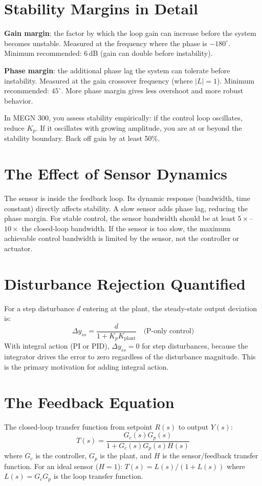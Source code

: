 \documentclass[11pt,letterpaper,twoside,openany]{book}
\begin{document}
\section{Stability Margins in Detail}
\textbf{Gain margin}: the factor by which the loop gain can increase before the system becomes unstable. Measured at the frequency where the phase is $-180^\circ$. Minimum recommended: 6\,dB (gain can double before instability).

\textbf{Phase margin}: the additional phase lag the system can tolerate before instability. Measured at the gain crossover frequency (where $|L| = 1$). Minimum recommended: $45^\circ$. More phase margin gives less overshoot and more robust behavior.

In MEGN 300, you assess stability empirically: if the control loop oscillates, reduce $K_p$. If it oscillates with growing amplitude, you are at or beyond the stability boundary. Back off gain by at least 50\%.

\section{The Effect of Sensor Dynamics}
The sensor is inside the feedback loop. Its dynamic response (bandwidth, time constant) directly affects stability. A slow sensor adds phase lag, reducing the phase margin. For stable control, the sensor bandwidth should be at least $5\times$--$10\times$ the closed-loop bandwidth. If the sensor is too slow, the maximum achievable control bandwidth is limited by the sensor, not the controller or actuator.

\section{Disturbance Rejection Quantified}
For a step disturbance $d$ entering at the plant, the steady-state output deviation is:
\begin{equation}
\Delta y_{ss} = \frac{d}{1 + K_p K_{\text{plant}}} \quad \text{(P-only control)}
\end{equation}
With integral action (PI or PID), $\Delta y_{ss} = 0$ for step disturbances, because the integrator drives the error to zero regardless of the disturbance magnitude. This is the primary motivation for adding integral action.
\section{The Feedback Equation}
The closed-loop transfer function from setpoint $R(s)$ to output $Y(s)$:
\begin{equation}
T(s) = \frac{G_c(s)G_p(s)}{1 + G_c(s)G_p(s)H(s)}
\end{equation}
where $G_c$ is the controller, $G_p$ is the plant, and $H$ is the sensor/feedback transfer function. For an ideal sensor ($H = 1$): $T(s) = L(s)/(1+L(s))$ where $L(s) = G_c G_p$ is the loop transfer function.
\end{document}
